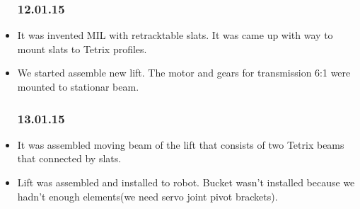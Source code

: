\begin{itemize}
\begin{enumerate}
		\end{enumerate} 	
		
	\subsubsection{12.01.15}
		\item It was invented MIL with retracktable slats. It was came up with way to mount slats to Tetrix profiles.
		
		\item We started assemble new lift. The motor and gears for transmission 6:1 were mounted to stationar beam.
	\subsubsection{13.01.15}
		\item It was assembled moving beam of the lift that consists of two Tetrix beams that connected by slats.
		
		\item Lift was assembled and installed to robot. Bucket wasn't installed because we hadn't enough elements(we need servo joint pivot brackets).
		

\end{itemize}
